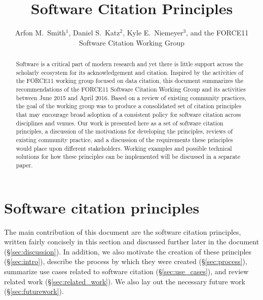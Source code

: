 \documentclass[12pt, oneside]{amsart}
\title{Software Citation Principles}
\author{Arfon M.~Smith$^1$, Daniel S.~Katz$^2$, Kyle E.~Niemeyer$^3$, and the FORCE11 Software Citation Working Group}
\date{}
\newcommand{\katznote}[1]{ {\textcolor{blue} { ***DSK: #1 }}} %
\newcommand{\niemnote}[1]{ {\textcolor{orange} { ***KEN: #1 }}} %
\begin{document}
\begin{abstract}

\vspace{-0.2cm}
Software is a critical part of modern research and yet there is little support across the scholarly ecosystem for its acknowledgement and citation.
Inspired by the activities of the FORCE11 working group focused on data citation, this document summarizes the recommendations of the FORCE11 Software Citation Working Group and its activities between June 2015 and April 2016.
Based on a review of existing community practices, the goal of the working group was to produce a consolidated set of citation principles that may encourage broad adoption of a consistent policy for software citation across disciplines and venues.
Our work is presented here as a set of software citation principles, a discussion of the motivations for developing the principles, reviews of existing community practice, and a discussion of the requirements these principles would place upon different stakeholders.
Working examples and possible technical solutions for how these principles can be implemented will be discussed in a separate paper.
\vspace{-1.0cm}

\end{abstract}

\maketitle

\section{Software citation principles}
\label{sec:principles}


The main contribution of this document are the software citation principles,
written fairly concisely in this section and discussed further later in the
document (\S\ref{sec:discussion}). In addition, we also motivate the creation
of these principles (\S\ref{sec:intro}), describe the process by which they
were created (\S\ref{sec:process}), summarize use cases related to software
citation (\S\ref{sec:use_cases}), and review related work
(\S\ref{sec:related_work}). We also lay out the necessary future work
(\S\ref{sec:futurework}).
\end{document}
